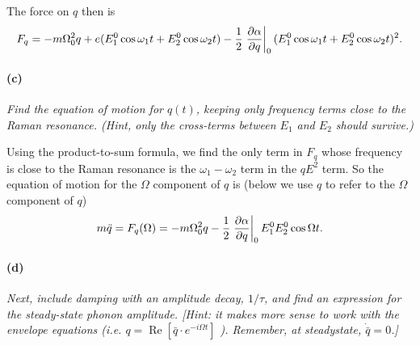 \documentclass[hyperref, a4paper]{article}
\begin{document}
The force on $q$ then is 
\begin{equation}
    F_q = - m \Omega_0^2 q 
    + e (E_1^0 \cos \omega_1 t + E_2^0 \cos \omega_2 t)
    - \frac{1}{2} \eval{\pdv{\alpha}{q}}_0 (E_1^0 \cos \omega_1 t + E_2^0 \cos \omega_2 t)^2.
\end{equation}

\paragraph*{(c)} \textit{
    Find the equation of motion for $q(t)$, keeping only frequency terms close to the Raman resonance. (Hint, only the cross-terms between $E_1$ and $E_2$ should survive.)
}

Using the product-to-sum formula, we find the only term in $F_q$ 
whose frequency is close to the Raman resonance 
is the $\omega_1 - \omega_2$ term in the $q E^2$ term.
So the equation of motion for the $\Omega$ component of $q$ is 
(below we use $q$ to refer to the $\Omega$ component of $q$)
\begin{equation}
    m \ddot{q} = F_q(\Omega)
    = - m \Omega_0^2 q - \frac{1}{2} \eval{\pdv{\alpha}{q}}_0 E_1^0 E_2^0 \cos \Omega t.
    \label{eq:continuous-raman-eom-1}
\end{equation}

\paragraph*{(d)} \textit{
    Next, include damping with an amplitude decay, $1 / \tau$, and find an expression for the steady-state phonon amplitude. [Hint: it makes more sense to work with the envelope equations (i.e. $q=\operatorname{Re}\left[\bar{q} \cdot e^{-i \Omega t}\right]$ ). Remember, at steadystate, $\dot{\bar{q}}=0$.]
}
\end{document}
